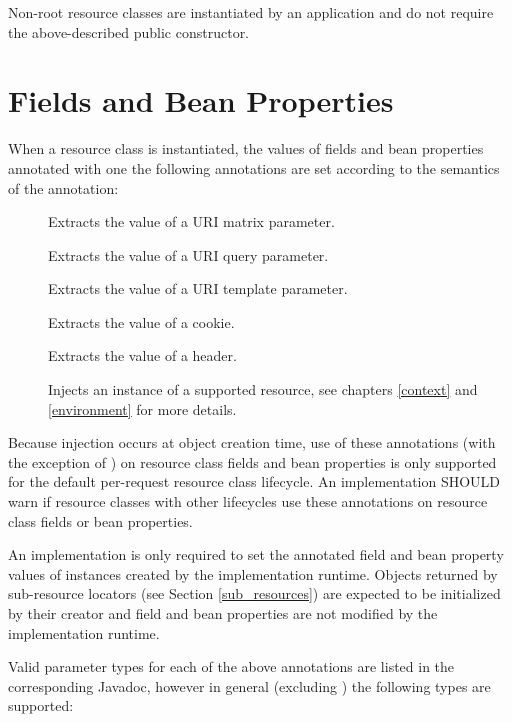 Non-root resource classes are instantiated by an application and do not require the above-described public constructor.

\section{Fields and Bean Properties}
\label{resource_field}

When a resource class is instantiated, the values of fields and bean properties annotated with one the following annotations are set according to the semantics of the annotation:

\begin{description}
\item[\MatrixParam] Extracts the value of a URI matrix parameter.
\item[\QueryParam] Extracts the value of a URI query parameter.
\item[\PathParam] Extracts the value of a URI template parameter.
\item[\CookieParam] Extracts the value of a cookie.
\item[\HeaderParam] Extracts the value of a header.
\item[\Context] Injects an instance of a supported resource, see chapters \ref{context} and \ref{environment} for more details.
\end{description}

Because injection occurs at object creation time, use of these annotations (with the exception of \Context) on resource class fields and bean properties is only supported for the default per-request resource class lifecycle. An implementation SHOULD warn if resource classes with other lifecycles use these annotations on resource class fields or bean properties.

An implementation is only required to set the annotated field and bean property values of instances created by the implementation runtime. Objects returned by sub-resource locators (see Section \ref{sub_resources}) are expected to be initialized by their creator and field and bean properties are not modified by the implementation runtime.

Valid parameter types for each of the above annotations are listed in the corresponding Javadoc, however in general (excluding \Context) the following types are supported:

